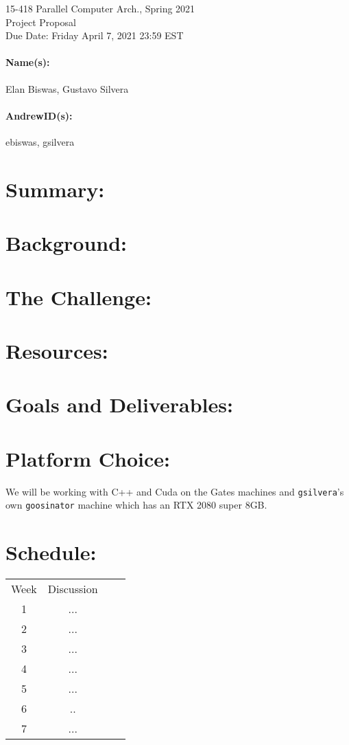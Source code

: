 \documentclass[12pt]{article}
\begin{document}
\begin{centering}
    {\large 15-418 Parallel Computer Arch., Spring 2021\\}
    \vspace{2ex}
    {\LARGE Project Proposal\\}
    \vspace{2ex}
    {\large Due Date: Friday April 7, 2021 23:59 EST\\}
\end{centering}

\bigskip

\paragraph{Name(s):}
Elan Biswas, Gustavo Silvera
\paragraph{AndrewID(s):}
ebiswas, gsilvera

\section*{Summary:} 

\section*{Background:}

\section*{The Challenge:}

\section*{Resources:}

\section*{Goals and Deliverables:}

\section*{Platform Choice:}
We will be working with C++ and Cuda on the Gates machines and \texttt{gsilvera}'s own \texttt{goosinator} machine which has an RTX 2080 super 8GB.
\section*{Schedule:}
\begin{tabular}{ |c|c|c|c| } 
	\hline
	Week & Discussion \\
	1 & ...\\ 
	2 & ...\\
	3 & ...\\
	4 & ...\\
	5 & ...\\
	6 & ..\\
	7 & ...\\
	\hline
\end{tabular}\\
\end{document}
